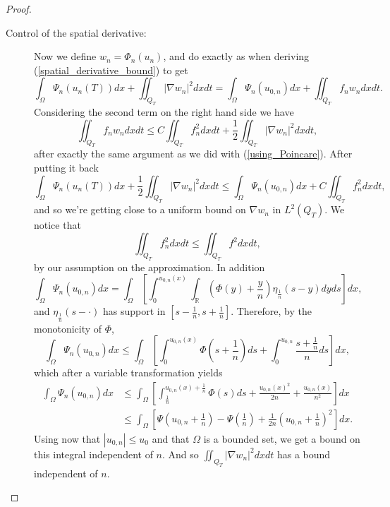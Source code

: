 \documentclass[11pt, a4paper]{article}
\begin{document}
\begin{proof}
\begin{description}
	\item[Control of the spatial derivative:] Now we define $w_n = \Phi_n(u_n)$, and do exactly as when deriving (\ref{spatial_derivative_bound}) to get 
	\begin{equation*}
	\int_\Omega \Psi_n(u_n(T))dx + \iint_{Q_T}|\nabla w_n|^2dxdt = \int_\Omega \Psi_n(u_{0,n})dx + \iint_{Q_T}f_n w_n dxdt.
	\end{equation*}
	Considering the second term on the right hand side we have
	\begin{equation*}
	\iint_{Q_T}f_n w_n dxdt \leq C\iint_{Q_T}f_n^2 dxdt + \frac{1}{2}\iint_{Q_T}|\nabla w_n|^2dxdt,
	\end{equation*}
	after exactly the same argument as we did with (\ref{using_Poincare}). After putting it back
	\begin{equation*}
	\int_\Omega \Psi_n(u_n(T))dx + \frac{1}{2}\iint_{Q_T}|\nabla w_n|^2 dxdt \leq \int_\Omega \Psi_n(u_{0,n})dx + C\iint_{Q_T}f_n^2 dxdt,
	\end{equation*}
	and so we're getting close to a uniform bound on $\nabla w_n$ in $L^2(Q_T)$. We notice that
	\begin{equation*}
	\iint_{Q_T}f_n^2dxdt \leq \iint_{Q_T} f^2 dxdt,
	\end{equation*}
	by our assumption on the approximation. In addition
	\begin{equation*}
	\int_\Omega \Psi_n(u_{0,n})dx = \int_\Omega \left[ \int_0^{u_{0,n}(x)} \int_\mathbb{R} \left(\Phi(y)+\frac{y}{n}\right)\eta_{\frac{1}{n}}(s-y)dy ds \right] dx,
	\end{equation*}
	and $\eta_{\frac{1}{n}}(s-\cdot)$ has support in $[s-\frac{1}{n}, s + \frac{1}{n}]$. Therefore, by the monotonicity of $\Phi$, 
	\begin{equation*}
	\int_\Omega \Psi_n(u_{0,n})dx \leq \int_\Omega \left[ \int_0^{u_{0,n}(x)}\Phi \left(s+\frac{1}{n} \right)ds + \int_0^{u_{0,n}}\frac{s+\frac{1}{n}}{n}ds \right] dx,
	\end{equation*}
	which after a variable transformation yields
	\begin{align*}
	\int_\Omega \Psi_n(u_{0,n})dx &\leq \int_\Omega \left[ \int_{\frac{1}{n} }^{u_{0,n}(x) + \frac{1}{n} } \Phi(s)ds + \frac{u_{0,n}(x)^2}{2n} + \frac{u_{0,n}(x)}{n^2} \right] dx \\
	&\leq \int_\Omega \left[ \Psi\left(u_{0,n} +\frac{1}{n}\right) - \Psi\left(\frac{1}{n}\right) + \frac{1}{2n}\left(u_{0,n} + \frac{1}{n}\right)^2 \right] dx.
	\end{align*}
	Using now that $|u_{0,n}| \leq u_0$ and that $\Omega$ is a bounded set, we get a bound on this integral independent of $n$. And so $\iint_{Q_T} |\nabla w_n|^2 dxdt$ has a bound independent of $n$.
	

\end{description}
\end{proof}
\end{document}
